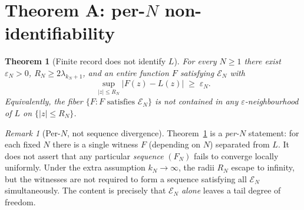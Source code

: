 \documentclass[12pt]{amsart}
\theoremstyle{definition}
\theoremstyle{remark}
\newtheorem{remark}[definition]{Remark}
\theoremstyle{plain}
\newtheorem{mainthm}{Theorem}
\begin{document}
\section{Theorem A: per-\texorpdfstring{$N$}{N} non-identifiability}
\label{sec:neg}

\begin{mainthm}[Finite record does not identify $L$]
\label{thm:neg}
For every $N\geq 1$ there exist $\varepsilon_N>0$, $R_N\geq 2\lambda_{k_N+1}$,
and an entire function $F$ satisfying $\mathcal{E}_N$ with
\[
  \sup_{|z|\leq R_N}\lvert F(z)-L(z)\rvert \;\geq\; \varepsilon_N.
\]
Equivalently, the fiber $\{F : F \text{ satisfies } \mathcal{E}_N\}$ is not
contained in any $\varepsilon$-neighbourhood of $L$ on $\{|z|\leq R_N\}$.
\end{mainthm}

\begin{remark}[Per-$N$, not sequence divergence]
\label{rem:per-N}
Theorem~\ref{thm:neg} is a \emph{per-$N$} statement: for each fixed $N$ there
is a single witness $F$ (depending on $N$) separated from $L$.  It does not
assert that any particular \emph{sequence} $(F_N)$ fails to converge locally
uniformly.  Under the extra assumption $k_N\to\infty$, the radii $R_N$ escape
to infinity, but the witnesses are not required to form a sequence satisfying
all $\mathcal{E}_N$ simultaneously.  The content is precisely that
$\mathcal{E}_N$ \emph{alone} leaves a tail degree of freedom.
\end{remark}
\end{document}
